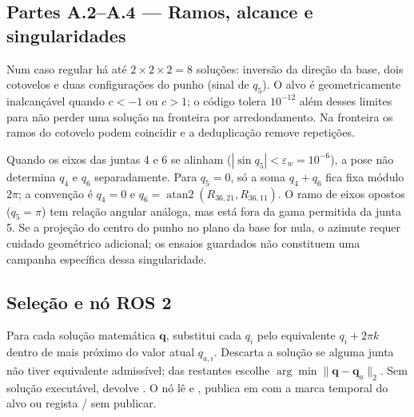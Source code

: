 \subsection{Partes A.2–A.4 — Ramos, alcance e singularidades}
Num caso regular há até $2\times2\times2=8$ soluções: inversão da direção da base, dois cotovelos e duas configurações do punho (sinal de $q_5$). O alvo é geometricamente inalcançável quando $c<-1$ ou $c>1$; o código tolera $10^{-12}$ além desses limites para não perder uma solução na fronteira por arredondamento. Na fronteira os ramos do cotovelo podem coincidir e a deduplicação remove repetições.

Quando os eixos das juntas 4 e 6 se alinham ($|\sin q_5|<\varepsilon_w=10^{-6}$), a pose não determina $q_4$ e $q_6$ separadamente. Para $q_5=0$, só a soma $q_4+q_6$ fica fixa módulo $2\pi$; a convenção é $q_4=0$ e $q_6=\operatorname{atan2}(R_{36,21},R_{36,11})$. O ramo de eixos opostos ($q_5=\pi$) tem relação angular análoga, mas está fora da gama permitida da junta 5. Se a projeção do centro do punho no plano da base for nula, o azimute requer cuidado geométrico adicional; os ensaios guardados não constituem uma campanha específica dessa singularidade.

\subsection{Seleção e nó ROS 2}
Para cada solução matemática $\mathbf q$,  substitui cada $q_i$ pelo equivalente $q_i+2\pi k$ dentro de  mais próximo do valor atual $q_{a,i}$. Descarta a solução se alguma junta não tiver equivalente admissível; das restantes escolhe $\arg\min\|\mathbf q-\mathbf q_a\|_2$. Sem solução executável, devolve . O nó lê  e , publica em  com a marca temporal do alvo ou regista / sem publicar.


